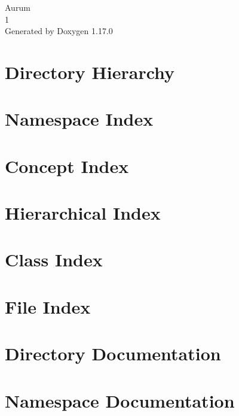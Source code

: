 \documentclass[twoside]{book}
\newcommand{\+}{\discretionary{\mbox{\scriptsize$\hookleftarrow$}}{}{}}
\newcommand{\clearemptydoublepage}{%
    \newpage{\pagestyle{empty}\cleardoublepage}%
  }
\begin{document}
  \raggedbottom
    \hypersetup{pageanchor=false,
                bookmarksnumbered=true,
                pdfencoding=unicode
               }
  \begin{titlepage}
  \vspace*{7cm}
  \begin{center}%
  {\Large Aurum}\\
  [1ex]\large 1 \\
  \vspace*{1cm}
  {\large Generated by Doxygen 1.17.0}\\
  \end{center}
  \end{titlepage}
  \clearemptydoublepage
  \tableofcontents
  \clearemptydoublepage
  \hypersetup{pageanchor=true}


\chapter{Directory Hierarchy}

\chapter{Namespace Index}

\chapter{Concept Index}

\chapter{Hierarchical Index}

\chapter{Class Index}

\chapter{File Index}

\chapter{Directory Documentation}


\chapter{Namespace Documentation}


\end{document}
